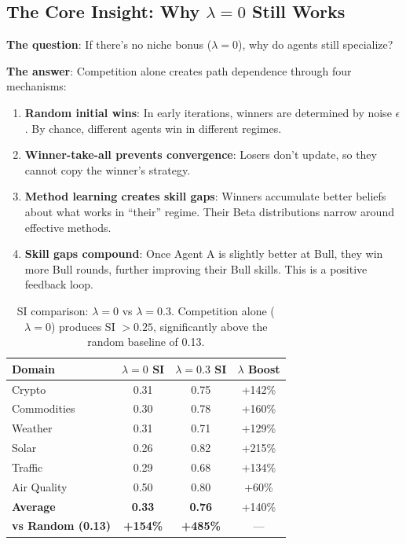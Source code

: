 
\subsection{The Core Insight: Why $\lambda = 0$ Still Works}

\textbf{The question}: If there's no niche bonus ($\lambda = 0$), why do agents still specialize?

\textbf{The answer}: Competition alone creates path dependence through four mechanisms:

\begin{enumerate}
    \item \textbf{Random initial wins}: In early iterations, winners are determined by noise $\epsilon$. By chance, different agents win in different regimes.

    \item \textbf{Winner-take-all prevents convergence}: Losers don't update, so they cannot copy the winner's strategy.

    \item \textbf{Method learning creates skill gaps}: Winners accumulate better beliefs about what works in ``their'' regime. Their Beta distributions narrow around effective methods.

    \item \textbf{Skill gaps compound}: Once Agent A is slightly better at Bull, they win more Bull rounds, further improving their Bull skills. This is a positive feedback loop.
\end{enumerate}

\begin{table}[h]
\centering
\small
\caption{SI comparison: $\lambda = 0$ vs $\lambda = 0.3$. Competition alone ($\lambda = 0$) produces SI $> 0.25$, significantly above the random baseline of 0.13.}
\begin{tabular}{l|cc|c}
\toprule
\textbf{Domain} & $\lambda = 0$ SI & $\lambda = 0.3$ SI & $\lambda$ Boost \\
\midrule
Crypto & 0.31 & 0.75 & +142\% \\
Commodities & 0.30 & 0.78 & +160\% \\
Weather & 0.31 & 0.71 & +129\% \\
Solar & 0.26 & 0.82 & +215\% \\
Traffic & 0.29 & 0.68 & +134\% \\
Air Quality & 0.50 & 0.80 & +60\% \\
\midrule
\textbf{Average} & \textbf{0.33} & \textbf{0.76} & +140\% \\
\textbf{vs Random (0.13)} & \textbf{+154\%} & \textbf{+485\%} & --- \\
\bottomrule
\end{tabular}
\end{table}

